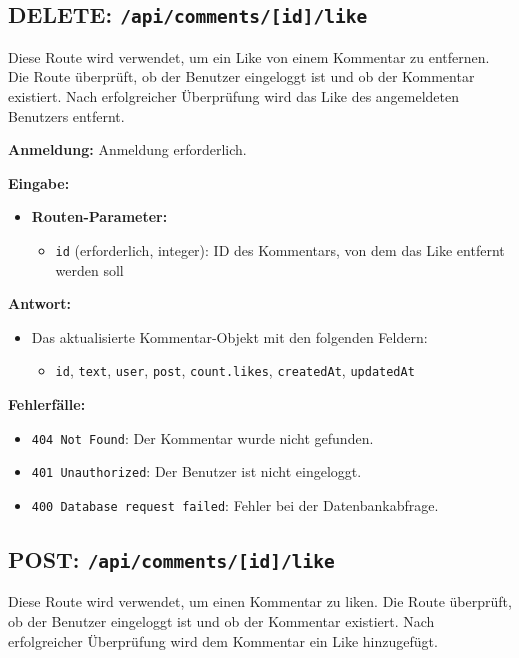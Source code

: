 \documentclass[a4paper,12pt]{article}
\begin{document}
\newpage
\subsection{DELETE: \texttt{/api/comments/[id]/like}}

Diese Route wird verwendet, um ein Like von einem Kommentar zu entfernen. Die Route überprüft, ob der Benutzer eingeloggt ist und ob der Kommentar existiert. Nach erfolgreicher Überprüfung wird das Like des angemeldeten Benutzers entfernt.

\textbf{Anmeldung:} Anmeldung erforderlich.

\textbf{Eingabe:}
\begin{itemize}
    \item \textbf{Routen-Parameter:}
    \begin{itemize}
        \item \texttt{id} (erforderlich, integer): ID des Kommentars, von dem das Like entfernt werden soll
    \end{itemize}
\end{itemize}

\textbf{Antwort:}
\begin{itemize}
    \item Das aktualisierte Kommentar-Objekt mit den folgenden Feldern:
    \begin{itemize}
        \item \texttt{id}, \texttt{text}, \texttt{user}, \texttt{post}, \texttt{count.likes}, \texttt{createdAt}, \texttt{updatedAt}
    \end{itemize}
\end{itemize}

\textbf{Fehlerfälle:}
\begin{itemize}
    \item \texttt{404 Not Found}: Der Kommentar wurde nicht gefunden.
    \item \texttt{401 Unauthorized}: Der Benutzer ist nicht eingeloggt.
    \item \texttt{400 Database request failed}: Fehler bei der Datenbankabfrage.
\end{itemize}

\newpage
\subsection{POST: \texttt{/api/comments/[id]/like}}

Diese Route wird verwendet, um einen Kommentar zu liken. Die Route überprüft, ob der Benutzer eingeloggt ist und ob der Kommentar existiert. Nach erfolgreicher Überprüfung wird dem Kommentar ein Like hinzugefügt.
\end{document}
